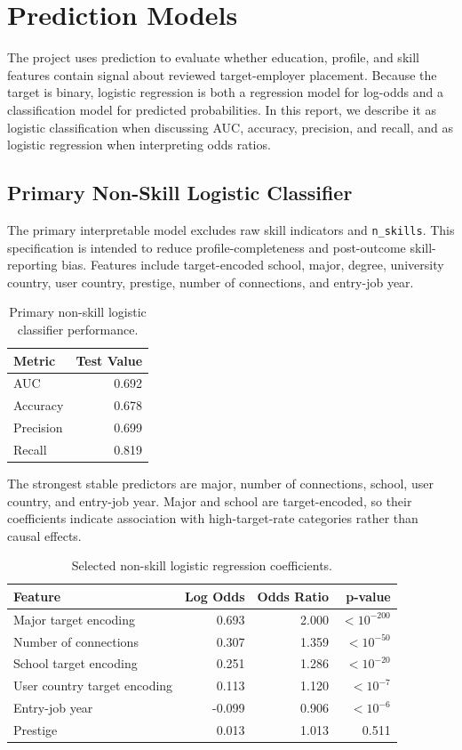 \documentclass[11pt]{article}
\begin{document}
\section{Prediction Models}

The project uses prediction to evaluate whether education, profile, and skill features contain signal about reviewed target-employer placement. Because the target is binary, logistic regression is both a regression model for log-odds and a classification model for predicted probabilities. In this report, we describe it as logistic classification when discussing AUC, accuracy, precision, and recall, and as logistic regression when interpreting odds ratios.

\subsection{Primary Non-Skill Logistic Classifier}

The primary interpretable model excludes raw skill indicators and \texttt{n\_skills}. This specification is intended to reduce profile-completeness and post-outcome skill-reporting bias. Features include target-encoded school, major, degree, university country, user country, prestige, number of connections, and entry-job year.

\begin{table}[H]
\centering
\caption{Primary non-skill logistic classifier performance.}
\label{tab:nonskill}
\begin{tabular}{lr}
\toprule
Metric & Test Value \\
\midrule
AUC & 0.692 \\
Accuracy & 0.678 \\
Precision & 0.699 \\
Recall & 0.819 \\
\bottomrule
\end{tabular}
\end{table}

The strongest stable predictors are major, number of connections, school, user country, and entry-job year. Major and school are target-encoded, so their coefficients indicate association with high-target-rate categories rather than causal effects.

\begin{table}[H]
\centering
\caption{Selected non-skill logistic regression coefficients.}
\label{tab:coefficients}
\begin{tabular}{lrrr}
\toprule
Feature & Log Odds & Odds Ratio & p-value \\
\midrule
Major target encoding & 0.693 & 2.000 & $<10^{-200}$ \\
Number of connections & 0.307 & 1.359 & $<10^{-50}$ \\
School target encoding & 0.251 & 1.286 & $<10^{-20}$ \\
User country target encoding & 0.113 & 1.120 & $<10^{-7}$ \\
Entry-job year & -0.099 & 0.906 & $<10^{-6}$ \\
Prestige & 0.013 & 1.013 & 0.511 \\
\bottomrule
\end{tabular}
\end{table}
\end{document}
